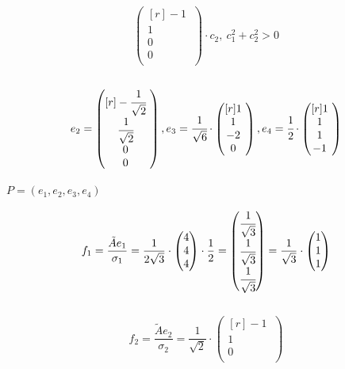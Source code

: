 \documentclass[12pt]{article}
\theoremstyle{definition}
\numberwithin{equation}{section}
\begin{document}
\begin{enumerate}
\[\begin{pmatrix}[r]
-1~\\         
1~\\
0~\\
0~\\
\end{pmatrix}\cdot c_2,~ c_1^2+c_2^2>0\]
\\
\[e_2 = \begin{pmatrix}[r]
-\cfrac{1}{\sqrt{2}}~\\         
\cfrac{1}{\sqrt{2}}~\\
0~\\
0~\\
\end{pmatrix}, e_3 = \cfrac{1}{\sqrt{6}} \cdot \begin{pmatrix}[r]
1~\\         
1~\\
-2~\\
0~\\
\end{pmatrix}, e_4 = \cfrac{1}{2} \cdot \begin{pmatrix}[r]
1~\\         
1~\\
1~\\
-1~\\
\end{pmatrix}\]
\end{enumerate}
\begin{center} $P=(e_1, e_2, e_3, e_4)$ \end{center}
\[f_1=\frac{\tilde{A}e_1}{\sigma_1}=\frac{1}{2\sqrt{3}} \cdot \begin{pmatrix}
4\\         
4\\
4\\
\end{pmatrix} \cdot \frac{1}{2} = \begin{pmatrix}
\cfrac{1}{\sqrt{3}}\\         
\cfrac{1}{\sqrt{3}}\\
\cfrac{1}{\sqrt{3}}\\
\end{pmatrix} = \frac{1}{\sqrt{3}} \cdot \begin{pmatrix}
1\\         
1\\
1\\
\end{pmatrix}\]
\\
\[f_2=\frac{\tilde{A}e_2}{\sigma_2}=\frac{1}{\sqrt{2}} \cdot \begin{pmatrix}[r]
-1~\\         
1~\\
0~\\
\end{pmatrix}\]
\end{document}
